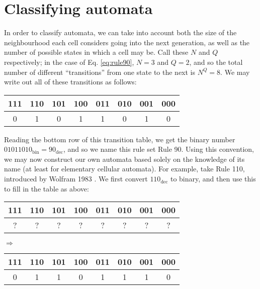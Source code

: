 \documentclass[11pt,a4paper]{article}
\begin{document}
\section{Classifying automata}
    In order to classify automata, we can take into account both the size of the
    neighbourhood each cell considers going into the next generation, as well as
    the number of possible states in which a cell may be. Call these $N$ and $Q$
    respectively; in the case of Eq. \ref{eq:rule90}, $N=3$ and $Q=2$, and so the
    total number of different ``transitions'' from one state to the next is $N^Q
    = 8$. We may write out all of these transitions as follows:

    \begin{table}[h]
        \centering
        \begin{tabular}{c|c|c|c|c|c|c|c}
            111 & 110 & 101 & 100 & 011 & 010 & 001 & 000 \\
            \hline
            0   & 1   & 0   & 1   & 1   & 0   & 1   & 0
        \end{tabular}
    \end{table}

    Reading the bottom row of this transition table, we get the binary number
    $01011010_{\text{bin}} = 90_{\text{dec}}$, and so we name this rule set Rule
    90. Using this convention, we may now construct our own automata based
    solely on the knowledge of its name (at least for elementary cellular
    automata). For example, take Rule 110, introduced by Wolfram 1983
    \cite{WolframRule110}. We first convert $110_{\text{dec}}$ to binary, and
    then use this to fill in the table as above:

    \begin{table}[h]
        \begin{minipage}{.5\linewidth}
            \centering
            \begin{tabular}{c|c|c|c|c|c|c|c}
                111 & 110 & 101 & 100 & 011 & 010 & 001 & 000 \\
                \hline
                ? & ? & ? & ? & ? & ? & ? & ?
            \end{tabular}
        \end{minipage}%
        $ \Rightarrow $
        \begin{minipage}{.6\linewidth}
            \begin{tabular}{c|c|c|c|c|c|c|c}
                111 & 110 & 101 & 100 & 011 & 010 & 001 & 000 \\
                \hline
                0 & 1 & 1 & 0 & 1 & 1 & 1 & 0
            \end{tabular}
        \end{minipage}
    \end{table}
\end{document}
